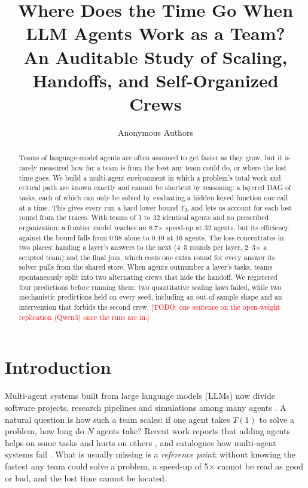 \documentclass[10pt,twocolumn]{article}
\title{\Large\bf Where Does the Time Go When LLM Agents Work as a Team?\\
\large An Auditable Study of Scaling, Handoffs, and Self-Organized Crews}
\author{Anonymous Authors}
\date{}
\newcommand{\todo}[1]{\textcolor{red}{[TODO: #1]}}
\newcommand{\Tlb}{T_{\mathrm{lb}}}
\begin{document}
\maketitle

\begin{abstract}
Teams of language-model agents are often assumed to get faster as they grow, but it is rarely measured how far a team is from the best any team could do, or where the lost time goes.
We build a multi-agent environment in which a problem's total work and critical path are known exactly and cannot be shortcut by reasoning: a layered DAG of tasks, each of which can only be solved by evaluating a hidden keyed function one call at a time.
This gives every run a hard lower bound $\Tlb$ and lets us account for each lost round from the traces.
With teams of 1 to 32 identical agents and no prescribed organization, a frontier model reaches an 8.7$\times$ speed-up at 32 agents, but its efficiency against the bound falls from 0.98 alone to 0.49 at 16 agents.
The loss concentrates in two places: handing a layer's answers to the next (4--5 rounds per layer, 2--3$\times$ a scripted team) and the final join, which costs one extra round for every answer its solver pulls from the shared store.
When agents outnumber a layer's tasks, teams spontaneously split into two alternating crews that hide the handoff.
We registered four predictions before running them: two quantitative scaling laws failed, while two mechanistic predictions held on every seed, including an out-of-sample shape and an intervention that forbids the second crew.
\todo{one sentence on the open-weight replication (Qwen3) once the runs are in.}
\end{abstract}

\section{Introduction}

Multi-agent systems built from large language models (LLMs) now divide software projects, research pipelines and simulations among many agents \citep{wu2023autogen,hong2024metagpt,qian2024chatdev,chen2024agentverse,park2023generative}.
A natural question is how such a team scales: if one agent takes $T(1)$ to solve a problem, how long do $N$ agents take?
Recent work reports that adding agents helps on some tasks and hurts on others \citep{li2024moreagents,qian2025macnet,kim2025scaling}, and catalogues how multi-agent systems fail \citep{cemri2025fail}.
What is usually missing is a \emph{reference point}: without knowing the fastest any team could solve a problem, a speed-up of 5$\times$ cannot be read as good or bad, and the lost time cannot be located.
\end{document}
